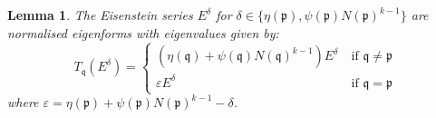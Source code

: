 \documentclass[10pt,a4paper]{amsart}
\newtheorem{lem}{Lemma}
\begin{document}
\begin{lem}
    The Eisenstein series $E^\delta$ for $\delta \in \{\eta(\mathfrak{p}), \psi(\mathfrak{p})N(\mathfrak{p})^{k-1}\} $ are normalised eigenforms with eigenvalues given by:
    \begin{equation*}
        T_{\mathfrak{q}}(E^\delta) = \begin{cases}
            (\eta(\mathfrak{q})+\psi(\mathfrak{q})N(\mathfrak{q})^{k-1}) E^\delta \ &\text{if } \mathfrak{q} \neq \mathfrak{p}\\
            \varepsilon E^\delta \ &\text{if } \mathfrak{q} = \mathfrak{p}
        \end{cases}
    \end{equation*}
    where $\varepsilon = \eta(\mathfrak{p})+\psi(\mathfrak{p})N(\mathfrak{p})^{k-1} - \delta$.
    
\end{lem}
\end{document}
